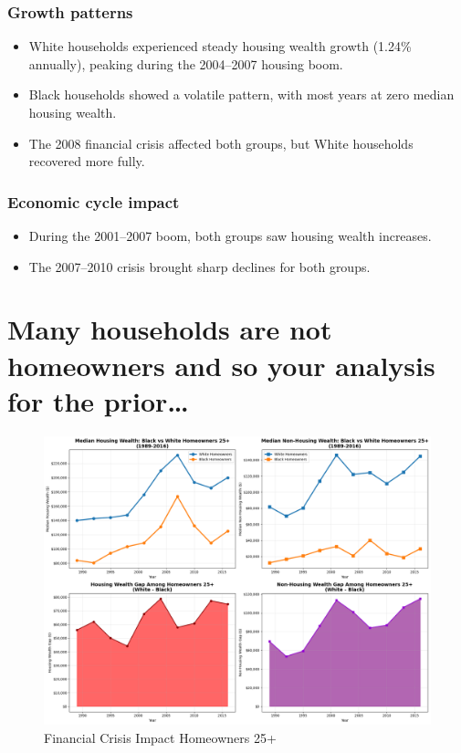 \documentclass[
  12pt]{article}
\providecommand{\tightlist}{%
  \setlength{\itemsep}{0pt}\setlength{\parskip}{0pt}}\usepackage{longtable,booktabs,array}
\begin{document}
\subsubsection{Growth patterns}\label{growth-patterns}

\begin{itemize}
\tightlist
\item
  White households experienced steady housing wealth growth (1.24\%
  annually), peaking during the 2004--2007 housing boom.
\item
  Black households showed a volatile pattern, with most years at zero
  median housing wealth.
\item
  The 2008 financial crisis affected both groups, but White households
  recovered more fully.
\end{itemize}

\subsubsection{Economic cycle impact}\label{economic-cycle-impact}

\begin{itemize}
\tightlist
\item
  During the 2001--2007 boom, both groups saw housing wealth increases.
\item
  The 2007--2010 crisis brought sharp declines for both groups.
\end{itemize}

\section{Many households are not homeowners and so your analysis for the
prior\ldots{}}\label{many-households-are-not-homeowners-and-so-your-analysis-for-the-prior}

\begin{figure}[H]

{\centering \includegraphics{Images/4.png}

}

\caption{Financial Crisis Impact Homeowners 25+}

\end{figure}%
\end{document}
